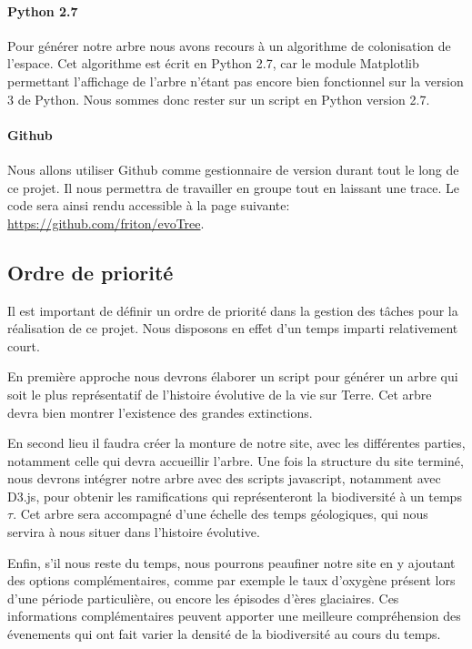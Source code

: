 \documentclass[a4paper]{article}
\begin{document}
		\paragraph{Python 2.7}
		Pour générer notre arbre nous avons recours à un algorithme de colonisation de l'espace. Cet algorithme est écrit en Python 2.7, car le module Matplotlib permettant l'affichage de l'arbre n'étant pas encore bien fonctionnel sur la version 3 de Python. Nous sommes donc rester sur un script en Python version 2.7. 

		\paragraph{Github}
		Nous allons utiliser Github comme gestionnaire de version durant tout le long de ce projet. Il nous permettra de travailler en groupe tout en laissant une trace. Le code sera ainsi rendu accessible à la page suivante: \url{https://github.com/friton/evoTree}.
	
	\subsection{Ordre de priorité}
		
		Il est important de définir un ordre de priorité dans la gestion des tâches pour la réalisation de ce projet. Nous disposons en effet d'un temps imparti relativement court.

		
		En première approche nous devrons élaborer un script pour générer un arbre qui soit le plus représentatif de l'histoire évolutive de la vie sur Terre. Cet arbre devra bien montrer l'existence des grandes extinctions. 
		
		En second lieu il faudra créer la monture de notre site, avec les différentes parties, notamment celle qui devra accueillir l'arbre.
		Une fois la structure du site terminé, nous devrons intégrer notre arbre avec des scripts javascript, notamment avec D3.js, pour obtenir les ramifications qui représenteront la biodiversité à un temps $\tau$. Cet arbre sera accompagné d'une échelle des temps géologiques, qui nous servira à nous situer dans l'histoire évolutive.

		
		Enfin, s'il nous reste du temps, nous pourrons peaufiner notre site en y ajoutant des options complémentaires, comme par exemple le taux d'oxygène présent lors d'une période particulière, ou encore les épisodes d'ères glaciaires. Ces informations complémentaires peuvent apporter une meilleure compréhension des évenements qui ont fait varier la densité de la biodiversité au cours du temps.
\end{document}
